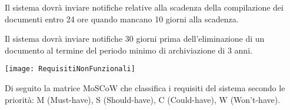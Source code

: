 \documentclass[a4paper]{report}
\begin{document}
Il sistema dovrà inviare notifiche relative alla scadenza della compilazione dei documenti entro 24 ore quando mancano 10 giorni alla scadenza.


Il sistema dovrà inviare notifiche 30 giorni prima dell'eliminazione di un documento al termine del periodo minimo di archiviazione di 3 anni.

\begin{figure*}[ht]
    \centering
    \texttt{[image: RequisitiNonFunzionali]}
\end{figure*}


\clearpage
{}

Di seguito la matrice MoSCoW che classifica i requisiti del sistema secondo le priorità: M (Must-have), S (Should-have), C (Could-have), W (Won't-have).
\end{document}
